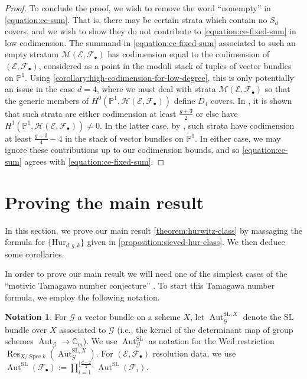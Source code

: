 \documentclass[12 pt]{amsart}
\newcommand{\rboxed}[1]{#1}
\theoremstyle{plain}
\theoremstyle{definition}
\newtheorem{notation}[theorem]{Notation}
\theoremstyle{remark}
\numberwithin{equation}{section}
\newcommand\bp{\mathbb P}
\newcommand\sce{\mathscr E}
\newcommand\scf{\mathscr F}
\newcommand\scg{\mathscr G}
\newcommand\sch{\mathscr H}
\DeclareMathOperator\spec{\operatorname{Spec}}
\newcommand\hur[3]{\mathrm{Hur}_{#1,#2,#3}} %
\newcommand\ce{\mathscr M} %
\DeclareMathOperator\res{Res}
\DeclareMathOperator\aut{Aut}
\renewcommand\sl{\mathrm{SL}}
\begin{document}
\begin{proof}
	To conclude the proof, we wish to remove the word ``nonempty'' in
	\eqref{equation:ce-sum}.
	That is, there may be certain strata which contain no $S_d$ covers,
	and we wish to show they do not contribute to 
	\eqref{equation:ce-fixed-sum} in low codimension.
	The summand in 
	\eqref{equation:ce-fixed-sum}
	associated to such an empty stratum
	$\ce(\sce, \scf_\bullet)$ has codimension equal to the codimension
	of $(\sce, \scf_\bullet)$, considered as a point in the moduli stack of
	tuples of vector bundles on $\bp^1$.
	Using \autoref{corollary:high-codimension-for-low-degree}, this is only
	potentially an issue in the case $d = 4$, where we must deal with strata
	$\ce(\sce, \scf_\bullet)$ so that the generic members of $H^0(\bp^1,
	\sch(\sce, \scf_\bullet))$ define $D_4$ covers.
	In 
	\cite[Lem.\
	5.5]{canningL:tautological-classes-on-low-degree-hurwitz-spaces},
	it is shown that such strata are either codimension at least
	$\frac{g+3}{2}$ or else have $H^1(\bp^1, \sch(\sce, \scf_\bullet)) \neq
	0$. In the latter case, 
	by 
	\cite[Lem.\
	5.4]{canningL:tautological-classes-on-low-degree-hurwitz-spaces},
	such strata have codimension at least
	$\frac{g + 3}{4}-4$ in the stack of vector bundles on $\bp^1$. 
	In either case, 
	we may ignore these contributions up to our codimension bounds,
	and so 
	\eqref{equation:ce-sum} agrees with \eqref{equation:ce-fixed-sum}.
\end{proof}

\section{Proving the main result}
\label{section:main-proof}
 
In this section, we prove our main result \autoref{theorem:hurwitz-class} 
by massaging the formula for $\{\hur
d g k\}$ given in \autoref{proposition:sieved-hur-class}.
We then deduce some corollaries.

In order to prove our main result
we will need one of the
simplest cases of the ``motivic Tamagawa number conjecture'' \cite[Conj.\
3.4]{behrendD:on-the-motivic-class-of-the-stack-of-bundles}.  
To start this Tamagawa number formula, we employ the following notation.
\begin{notation} \label{notation:} For $\scg$ a vector bundle on a scheme $X$,
	let $\rboxed{\aut^{\sl,X}_{\scg}}$ denote the $\sl$ bundle over $X$
	associated to $\scg$ (i.e., the kernel of the determinant map of group
	schemes $\aut_{\scg} \to \mathbb G_m$).  We use $\aut^{\sl}_{\scg}$ as
	notation for the Weil restriction $\res_{X/\spec
	k}(\aut^{\sl,X}_{\scg})$.  For $(\sce, \scf_\bullet)$ 
	resolution data, we use $\rboxed{\aut^{\sl}(\scf_\bullet)} :=
	\prod_{i=1}^{\lfloor \frac{d-2}{2} \rfloor} \aut^{\sl}(\scf_i)$.  
\end{notation}
\end{document}
